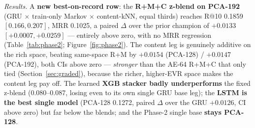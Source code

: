 \documentclass[11pt]{article}
\begin{document}
\emph{Results.} A \textbf{new best-on-record row}: the \textbf{R+M+C z-blend on
PCA-192} (GRU $\times$ train-only Markov $\times$ content-kNN, equal thirds)
reaches R@10 \num{0.1859} $[0.166, 0.207]$, MRR \num{0.1025}, a paired $\Delta$
over the prior champion of $+\num{0.0133}$ $[+0.0007, +0.0259]$ --- entirely
above zero, with no MRR regression (Table~\ref{tab:phase2};
Figure~\ref{fig:phase2}). The content leg is genuinely additive on the rich
space, beating same-space R+M by $+\num{0.0154}$ (PCA-128) / $+\num{0.0147}$
(PCA-192), both CIs above zero --- \emph{stronger} than the AE-64 R+M+C that
only tied (Section~\ref{sec:graded}), because the richer, higher-EVR space makes
the content leg pay off. The learned \textbf{XGB stacker badly underperforms} the
fixed z-blend (\num{0.080}--\num{0.087}, losing even to its own single GRU base
leg); the \textbf{LSTM is the best single model} (PCA-128 \num{0.1272}, paired
$\Delta$ over the GRU $+\num{0.0126}$, CI above zero) but far below the blends;
and the Phase-2 single base \textbf{stays PCA-128}.
\end{document}
